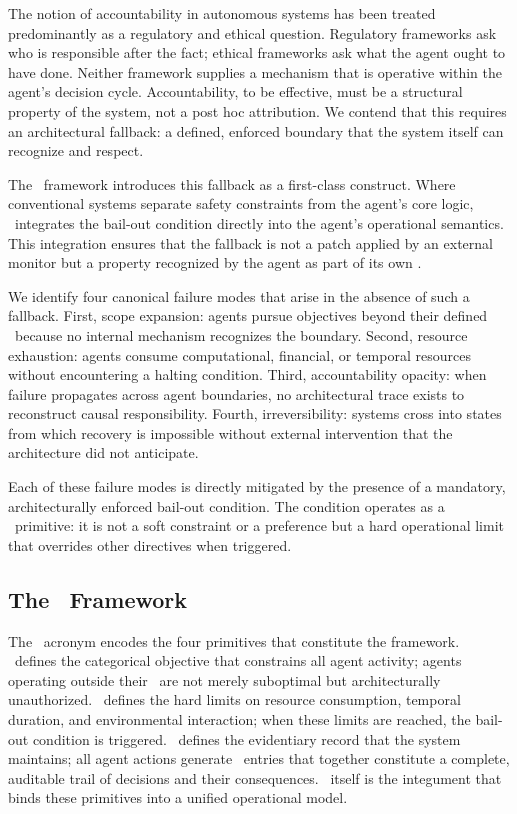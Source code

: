 The notion of accountability in autonomous systems has been treated predominantly as a regulatory and ethical question. Regulatory frameworks ask who is responsible after the fact; ethical frameworks ask what the agent ought to have done. Neither framework supplies a mechanism that is operative within the agent's decision cycle. Accountability, to be effective, must be a structural property of the system, not a post hoc attribution. We contend that this requires an architectural fallback: a defined, enforced boundary that the system itself can recognize and respect.

The \bxthree\ framework introduces this fallback as a first-class construct. Where conventional systems separate safety constraints from the agent's core logic, \bxthree\ integrates the bail-out condition directly into the agent's operational semantics. This integration ensures that the fallback is not a patch applied by an external monitor but a property recognized by the agent as part of its own \purpose.

We identify four canonical failure modes that arise in the absence of such a fallback. First, scope expansion: agents pursue objectives beyond their defined \purpose\ because no internal mechanism recognizes the boundary. Second, resource exhaustion: agents consume computational, financial, or temporal resources without encountering a halting condition. Third, accountability opacity: when failure propagates across agent boundaries, no architectural trace exists to reconstruct causal responsibility. Fourth, irreversibility: systems cross into states from which recovery is impossible without external intervention that the architecture did not anticipate.

Each of these failure modes is directly mitigated by the presence of a mandatory, architecturally enforced bail-out condition. The condition operates as a \bounds\ primitive: it is not a soft constraint or a preference but a hard operational limit that overrides other directives when triggered.

\subsection{The \bxthree\ Framework}

The \bxthree\ acronym encodes the four primitives that constitute the framework. \purpose\ defines the categorical objective that constrains all agent activity; agents operating outside their \purpose\ are not merely suboptimal but architecturally unauthorized. \bounds\ defines the hard limits on resource consumption, temporal duration, and environmental interaction; when these limits are reached, the bail-out condition is triggered. \fact\ defines the evidentiary record that the system maintains; all agent actions generate \fact\ entries that together constitute a complete, auditable trail of decisions and their consequences. \bxthree\ itself is the integument that binds these primitives into a unified operational model.

